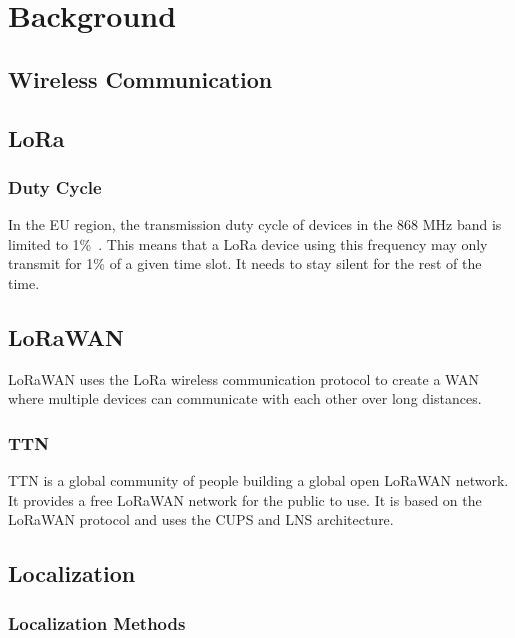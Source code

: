 \chapter{Background}

\section{Wireless Communication}
\section{\acf{LoRa}}


\subsection{Duty Cycle}


In the \ac{EU} region, the transmission duty cycle of devices in the 868 MHz band is limited to 1\%~\cite{etsi_etsi_2012}.
This means that a \ac{LoRa} device using this frequency may only transmit for 1\% of a given time slot.
It needs to stay silent for the rest of the time.

\section{\acf{LoRaWAN}}

\ac{LoRaWAN} uses the LoRa wireless communication protocol to create a \ac{WAN} where multiple devices can communicate with each other over long distances.

\subsection{\acf{TTN}}

\ac{TTN} is a global community of people building a global open \ac{LoRaWAN} network.
It provides a free \ac{LoRaWAN} network for the public to use.
It is based on the \ac{LoRaWAN} protocol and uses the \ac{CUPS} and \ac{LNS} architecture.


\section{Localization}

\subsection{Localization Methods}


